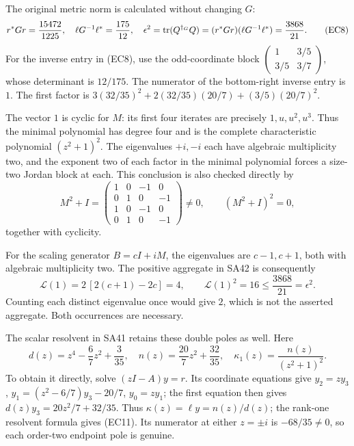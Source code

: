 \documentclass[11pt]{article}
\begin{document}
The original metric norm is calculated without changing \(G\):
\begin{equation}
 r^*Gr=\frac{15472}{1225},\quad
 \ell G^{-1}\ell^*=\frac{175}{12},\quad
 \epsilon^2=\operatorname{tr}(Q^{\dagger_G}Q)
     =(r^*Gr)(\ell G^{-1}\ell^*)=\frac{3868}{21}.
 \tag{EC8}
\end{equation}
For the inverse entry in (EC8), use the odd-coordinate block
\(\left(\begin{smallmatrix}1&3/5\\3/5&3/7\end{smallmatrix}\right)\),
whose determinant is \(12/175\). The numerator of the bottom-right
inverse entry is \(1\). The first factor is
\(3(32/35)^2+2(32/35)(20/7)+(3/5)(20/7)^2\).

The vector \(1\) is cyclic for \(M\): its first four iterates
are precisely \(1,u,u^2,u^3\). Thus the minimal polynomial has
degree four and is the complete characteristic polynomial
\((z^2+1)^2\). The eigenvalues \(+i,-i\) each have algebraic
multiplicity two, and the exponent two of each factor in the
minimal polynomial forces a size-two Jordan block at each.
This conclusion is also checked directly by
\begin{equation}
 M^2+I=
 \begin{pmatrix}
 1&0&-1&0\\0&1&0&-1\\1&0&-1&0\\0&1&0&-1
 \end{pmatrix}\ne0,\qquad (M^2+I)^2=0,
 \tag{EC9}
\end{equation}
together with cyclicity.

For the scaling generator \(B=cI+iM\), the eigenvalues are
\(c-1,c+1\), both with algebraic multiplicity two. The
positive aggregate in SA42 is consequently
\begin{equation}
 \mathcal L(1)=2\,[2(c+1)-2c]=4,\qquad
 \mathcal L(1)^2=16\le\frac{3868}{21}=\epsilon^2 .
 \tag{EC10}
\end{equation}
Counting each distinct eigenvalue once would give \(2\), which is
not the asserted aggregate. Both occurrences are necessary.

The scalar resolvent in SA41 retains these double poles as well.
Here
\begin{equation}
 d(z)=z^4-\frac67z^2+\frac3{35},\quad
 n(z)=\frac{20}{7}z^2+\frac{32}{35},\quad
 \kappa_1(z)=\frac{n(z)}{(z^2+1)^2}.
 \tag{EC11}
\end{equation}
To obtain it directly, solve \((zI-A)y=r\). Its coordinate
equations give \(y_2=zy_3\),
\(y_1=(z^2-6/7)y_3-20/7\), \(y_0=zy_1\);
the first equation then gives
\(d(z)y_3=20z^2/7+32/35\).
Thus \(\kappa(z)=\ell y=n(z)/d(z)\);
the rank-one resolvent formula gives (EC11).
Its numerator at either \(z=\pm i\) is \(-68/35\ne0\), so
each order-two endpoint pole is genuine.
\end{document}
